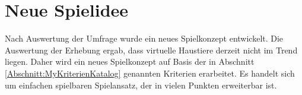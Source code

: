








\section{Neue Spielidee} 
Nach Auswertung der Umfrage wurde ein neues Spielkonzept entwickelt. 
Die Auswertung der Erhebung ergab, dass virtuelle Haustiere derzeit nicht im Trend liegen. Daher wird ein neues Spielkonzept auf Basis der in Abschnitt \ref{Abschnitt:MyKriterienKatalog} genannten Kriterien erarbeitet. Es handelt sich um einfachen spielbaren Spielansatz, der in vielen Punkten erweiterbar ist. 






